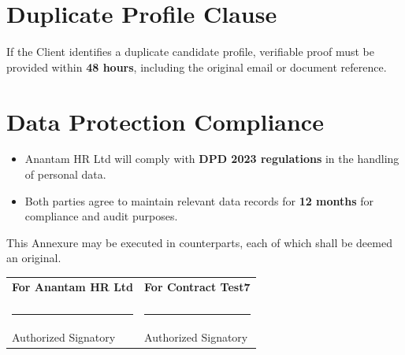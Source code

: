 \documentclass[12pt]{article}
\begin{document}
\section{Duplicate Profile Clause}

If the Client identifies a duplicate candidate profile, verifiable proof must be provided within \textbf{48 hours}, including the original email or document reference.

\section{Data Protection Compliance}

\begin{itemize}
\item Anantam HR Ltd will comply with \textbf{DPD 2023 regulations} in the handling of personal data.

\item Both parties agree to maintain relevant data records for \textbf{12 months} for compliance and audit purposes.
\end{itemize}

\vspace{1cm}

This Annexure may be executed in counterparts, each of which shall be deemed an original.

\vspace{1.5cm}

\begin{tabular}{p{7cm} p{7cm}}

\textbf{For Anantam HR Ltd} & \textbf{For Contract Test7} \\

\vspace{2cm} & \vspace{2cm} \\

\rule{6cm}{0.4pt} & \rule{6cm}{0.4pt} \\
Authorized Signatory & Authorized Signatory \\

\end{tabular}
\end{document}
